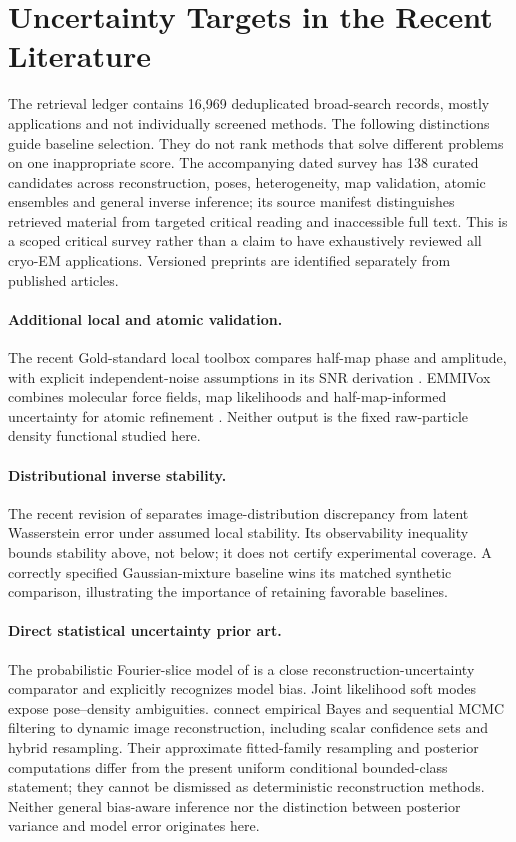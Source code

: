 \section{Uncertainty Targets in the Recent Literature}\label{app:survey}
The retrieval ledger contains 16,969 deduplicated broad-search records, mostly applications and not individually screened methods. The following distinctions guide baseline selection. They do not rank methods that solve different problems on one inappropriate score. The accompanying dated survey has 138 curated candidates across reconstruction, poses, heterogeneity, map validation, atomic ensembles and general inverse inference; its source manifest distinguishes retrieved material from targeted critical reading and inaccessible full text. This is a scoped critical survey rather than a claim to have exhaustively reviewed all cryo-EM applications. Versioned preprints are identified separately from published articles.

\paragraph{Additional local and atomic validation.} The recent Gold-standard local toolbox compares half-map phase and amplitude, with explicit independent-noise assumptions in its SNR derivation \citep{goldlocal2026}. EMMIVox combines molecular force fields, map likelihoods and half-map-informed uncertainty for atomic refinement \citep{emmivox2024}. Neither output is the fixed raw-particle density functional studied here.

\paragraph{Distributional inverse stability.} The recent revision of
\citet{stochastic2026} separates image-distribution discrepancy from latent
Wasserstein error under assumed local stability. Its observability inequality
bounds stability above, not below; it does not certify experimental coverage.
A correctly specified Gaussian-mixture baseline wins its matched synthetic
comparison, illustrating the importance of retaining favorable baselines.

\paragraph{Direct statistical uncertainty prior art.} The probabilistic Fourier-slice model of \citet{ullrich2020} is a close reconstruction-uncertainty comparator and explicitly recognizes model bias. Joint likelihood soft modes \citep{rangan2024} expose pose--density ambiguities. \citet{lai2023} connect empirical Bayes and sequential MCMC filtering to dynamic image reconstruction, including scalar confidence sets and hybrid resampling. Their approximate fitted-family resampling and posterior computations differ from the present uniform conditional bounded-class statement; they cannot be dismissed as deterministic reconstruction methods. Neither general bias-aware inference nor the distinction between posterior variance and model error originates here.


